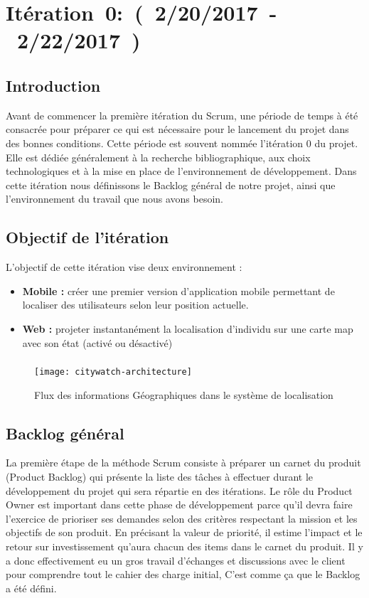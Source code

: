 \section{Itération~0:~(~2/20/2017~-~2/22/2017~)}

\subsection*{Introduction}
Avant de commencer la première itération du Scrum, une période de temps à été
consacrée pour préparer ce qui est nécessaire pour le lancement du projet dans des
bonnes conditions. 
Cette période est souvent nommée l'itération 0 du projet.
Elle est dédiée généralement à la recherche bibliographique, aux choix
technologiques et à la mise en place de l'environnement de développement.
Dans cette itération nous définissons le Backlog général 
de notre projet, ainsi que l'environnement du travail que nous avons besoin.
\subsection{Objectif de l'itération}
L'objectif de cette itération vise deux environnement :
\begin{itemize}
 \item \textbf{Mobile :} créer une premier version d'application mobile permettant de localiser 
des utilisateurs selon leur position actuelle.
\item \textbf{Web :} projeter instantanément la localisation d'individu sur une carte map avec son état
(activé ou désactivé)
\end{itemize}
\subsubsection*{}
\begin{figure}[htbp]
  \centering
  \texttt{[image: citywatch-architecture]}
  \caption[Flux des information Géographiques en CityWatch]
  {Flux des informations Géographiques dans le système de localisation}
  \label{fig:citywatch-architecture}
\end{figure}

\subsection{Backlog général}

La première étape de la méthode Scrum consiste à préparer un carnet du produit
(Product Backlog) qui présente la liste des tâches à effectuer durant le
développement du projet qui sera répartie en des itérations. Le rôle du
Product Owner est important dans cette phase de développement parce qu'il devra
faire l'exercice de prioriser ses demandes selon des critères respectant la
mission et les objectifs de son produit. En précisant la valeur de priorité, il
estime l'impact et le retour sur investissement qu'aura chacun des items dans
le carnet du produit. Il y a donc effectivement eu un gros travail d'échanges
et discussions avec le client pour comprendre tout le cahier des charge
initial, C'est comme ça que le Backlog a été défini.

